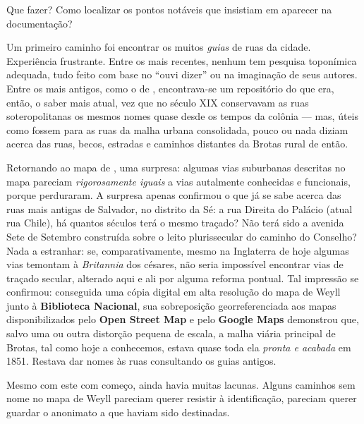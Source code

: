 Que fazer? Como localizar os pontos notáveis que insistiam em aparecer na documentação?

Um primeiro caminho foi encontrar os muitos \textit{guias} de ruas da cidade. Experiência frustrante. Entre os mais recentes, nenhum tem pesquisa toponímica adequada, tudo feito com base no ``ouvi dizer'' ou na imaginação de seus autores. Entre os mais antigos, como o de , encontrava-se um repositório do que era, então, o saber mais atual, vez que no século XIX conservavam as ruas soteropolitanas os mesmos nomes quase desde os tempos da colônia --- mas, úteis como fossem para as ruas da malha urbana consolidada, pouco ou nada diziam acerca das ruas, becos, estradas e caminhos distantes da Brotas rural de então.

Retornando ao mapa de , uma surpresa: algumas vias suburbanas descritas no mapa pareciam \textit{rigorosamente iguais} a vias autalmente conhecidas e funcionais, porque perduraram. A surpresa apenas confirmou o que já se sabe acerca das ruas mais antigas de Salvador, no distrito da Sé: a rua Direita do Palácio (atual rua Chile), há quantos séculos terá o mesmo traçado? Não terá sido a avenida Sete de Setembro construída sobre o leito plurissecular do caminho do Conselho? Nada a estranhar: se, comparativamente, mesmo na Inglaterra de hoje algumas vias temontam à \textit{Britannia} dos césares, não seria impossível encontrar vias de traçado secular, alterado aqui e ali por alguma reforma pontual. Tal impressão se confirmou: conseguida uma cópia digital em alta resolução do mapa de Weyll junto à \textbf{Biblioteca Nacional}, sua sobreposição georreferenciada aos mapas disponibilizados pelo \textbf{Open Street Map} e pelo \textbf{Google Maps} demonstrou que, salvo uma ou outra distorção pequena de escala, a malha viária principal de Brotas, tal como hoje a conhecemos, estava quase toda ela \textit{pronta e acabada} em 1851. Restava dar nomes às ruas consultando os guias antigos.

Mesmo com este com começo, ainda havia muitas lacunas. Alguns caminhos sem nome no mapa de Weyll pareciam querer resistir à identificação, pareciam querer guardar o anonimato a que haviam sido destinadas.

